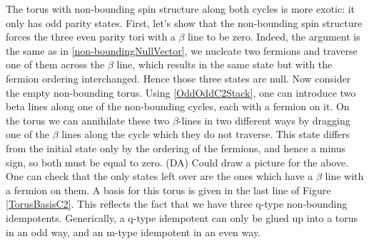 \documentclass[12pt,a4paper]{article}
\newcommand{\dave}[1]{{\color{ao(english)}\footnotesize{(DA) #1}}}
\begin{document}
The torus with non-bounding spin structure along both cycles is more exotic: it only has odd parity states.
First, let's show that the non-bounding spin structure forces the three even parity tori with a $\beta$ line to be zero.
Indeed, the argument is the same as in \eqref{non-boundingNullVector}, 
we nucleate two fermions and traverse one of them across the $\beta$ line, which results in the same state 
but with the fermion ordering interchanged. 
Hence those three states are null. 
Now consider the empty non-bounding torus.
Using \eqref{OddOddC2Stack}, one can introduce two beta lines along one of the non-bounding cycles, each with a fermion on it. 
On the torus we can annihilate these two $\beta$-lines in two different ways by 
dragging one of the $\beta$ lines along the cycle which they do not traverse.
This state differs from the initial state only by the ordering of the fermions, and hence a minus sign, 
so both must be equal to zero.
\dave{Could draw a picture for the above.}
One can check that the only states left over are the ones which have a $\beta$ line with a fermion on them. 
A basis for this torus is given in the last line of Figure \ref{TorusBasisC2}.
This reflects the fact that we have three q-type non-bounding idempotents.
Generically, a q-type idempotent can only be glued up into a torus in an odd way, and an m-type idempotent in an even way.
 
 



 
\end{document}
